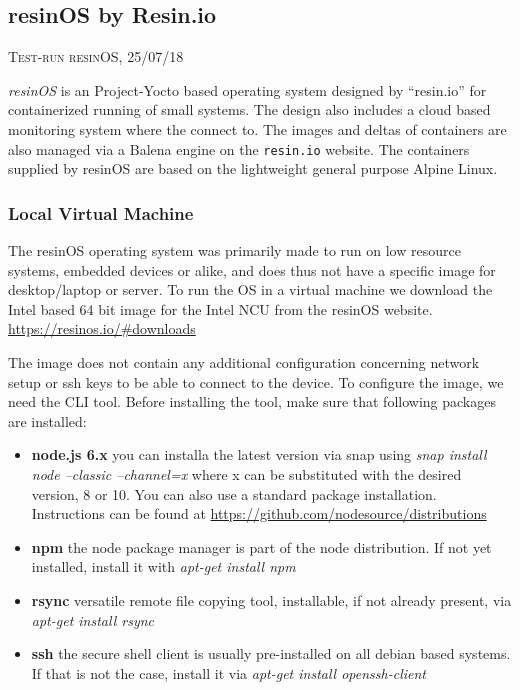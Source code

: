 \documentclass[]{scrartcl}
\begin{document}
\subsection{resinOS by Resin.io}

{\small\textsc{Test-run resinOS, 25/07/18} \bigskip}

\textit{resinOS} is an Project-Yocto based operating system designed by ``resin.io'' for containerized running of small systems. The design also includes a cloud based monitoring system where the connect to. The images and deltas of containers are also managed via a Balena engine on the \texttt{resin.io} website. The containers supplied by resinOS are based on the lightweight general purpose Alpine Linux.

\subsubsection{Local Virtual Machine}

The resinOS operating system was primarily made to run on low resource systems, embedded devices or alike, and does thus not have a specific image for desktop/laptop or server. To run the OS in a virtual machine we download the Intel based 64 bit image for the Intel NCU from the resinOS website. \url{https://resinos.io/#downloads}

The image does not contain any additional configuration concerning network setup or ssh keys to be able to connect to the device. To configure the image, we need the CLI tool. Before installing the tool, make sure that following packages are installed:

\begin{itemize}
	
	\item \textbf{node.js 6.x} you can installa the latest version via snap using \textit{snap install node --classic --channel=x} where x can be substituted with the desired version, 8 or 10. You can also use a standard package installation. Instructions can be found at \url{https://github.com/nodesource/distributions}
	\item \textbf{npm} the node package manager is part of the node distribution. If not yet installed, install it with \textit{apt-get install npm}
	\item \textbf{rsync} versatile remote file copying tool, installable, if not already present, via \textit{apt-get install rsync}
	\item \textbf{ssh} the secure shell client is usually pre-installed on all debian based systems. If that is not the case, install it via \textit{apt-get install openssh-client}
	
\end{itemize}
\end{document}
